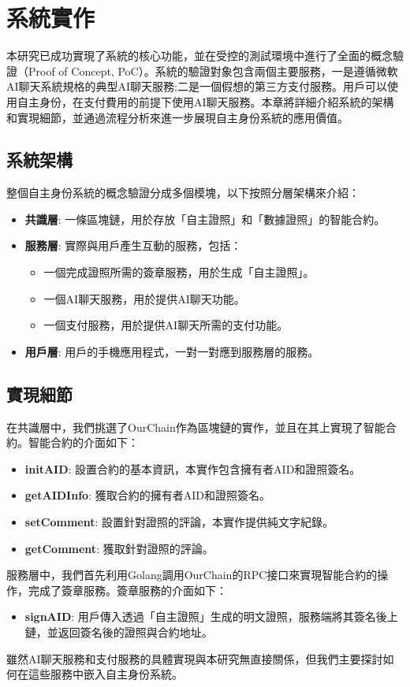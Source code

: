 
\chapter{系統實作}
本研究已成功實現了系統的核心功能，並在受控的測試環境中進行了全面的概念驗證（Proof of Concept, PoC）。系統的驗證對象包含兩個主要服務，一是遵循微軟AI聊天系統規格\cite{microsoft_ai_chat_protocol}的典型AI聊天服務;二是一個假想的第三方支付服務。用戶可以使用自主身份，在支付費用的前提下使用AI聊天服務。本章將詳細介紹系統的架構和實現細節，並通過流程分析來進一步展現自主身份系統的應用價值。
\section{系統架構}
整個自主身份系統的概念驗證分成多個模塊，以下按照分層架構來介紹：
\begin{itemize}
  \item \textbf{共識層}: 一條區塊鏈，用於存放「自主證照」和「數據證照」的智能合約。
  \item \textbf{服務層}: 實際與用戶產生互動的服務，包括：
        \begin{itemize}
          \item 一個完成證照所需的簽章服務，用於生成「自主證照」。
          \item 一個AI聊天服務，用於提供AI聊天功能。
          \item 一個支付服務，用於提供AI聊天所需的支付功能。
        \end{itemize}
  \item \textbf{用戶層}: 用戶的手機應用程式，一對一對應到服務層的服務。
\end{itemize}
\section{實現細節}
在共識層中，我們挑選了OurChain\cite{ourlab408_ourchain}作為區塊鏈的實作，並且在其上實現了智能合約。智能合約的介面如下：
\begin{itemize}
  \item \textbf{initAID}: 設置合約的基本資訊，本實作包含擁有者AID和證照簽名。
  \item \textbf{getAIDInfo}: 獲取合約的擁有者AID和證照簽名。
  \item \textbf{setComment}: 設置針對證照的評論，本實作提供純文字紀錄。
  \item \textbf{getComment}: 獲取針對證照的評論。
\end{itemize}
服務層中，我們首先利用Golang調用OurChain的RPC接口來實現智能合約的操作，完成了簽章服務。簽章服務的介面如下：
\begin{itemize}
  \item \textbf{signAID}: 用戶傳入透過「自主證照」生成的明文證照，服務端將其簽名後上鏈，並返回簽名後的證照與合約地址。
\end{itemize}
雖然AI聊天服務和支付服務的具體實現與本研究無直接關係，但我們主要探討如何在這些服務中嵌入自主身份系統。

